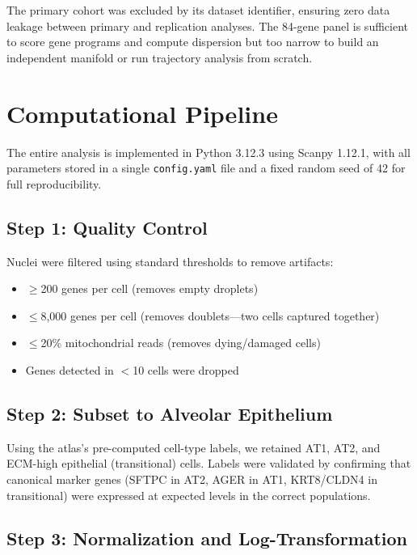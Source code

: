 \documentclass[11pt]{article}
\begin{document}
The primary cohort was excluded by its dataset identifier, ensuring zero data leakage between primary and replication analyses. The 84-gene panel is sufficient to score gene programs and compute dispersion but too narrow to build an independent manifold or run trajectory analysis from scratch.


\section{Computational Pipeline}

The entire analysis is implemented in Python 3.12.3 using Scanpy 1.12.1, with all parameters stored in a single \texttt{config.yaml} file and a fixed random seed of 42 for full reproducibility.

\subsection{Step 1: Quality Control}

Nuclei were filtered using standard thresholds to remove artifacts:
\begin{itemize}
\item $\geq$200 genes per cell (removes empty droplets)
\item $\leq$8,000 genes per cell (removes doublets---two cells captured together)
\item $\leq$20\% mitochondrial reads (removes dying/damaged cells)
\item Genes detected in $<$10 cells were dropped
\end{itemize}

\subsection{Step 2: Subset to Alveolar Epithelium}

Using the atlas's pre-computed cell-type labels, we retained AT1, AT2, and ECM-high epithelial (transitional) cells. Labels were validated by confirming that canonical marker genes (SFTPC in AT2, AGER in AT1, KRT8/CLDN4 in transitional) were expressed at expected levels in the correct populations.

\subsection{Step 3: Normalization and Log-Transformation}
\end{document}
